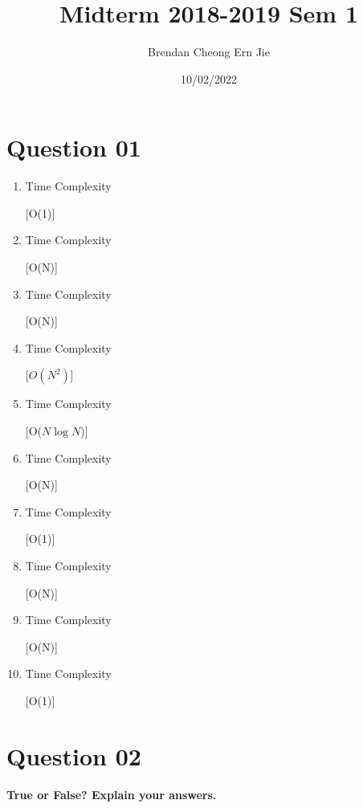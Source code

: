 \documentclass{article}
\title{Midterm 2018-2019 Sem 1}
\author{Brendan Cheong Ern Jie}
\date {10/02/2022}
\begin{document}
\maketitle

\section{Question 01}

\begin{enumerate}[label=(\arabic*)]

\item Time Complexity

[O(1)]

\item Time Complexity

[O(N)]

\item Time Complexity

[O(N)]

\item Time Complexity

[$O(N^2)$]

\item Time Complexity

[O($N\log N$)]

\item Time Complexity

[O(N)]

\item Time Complexity

[O(1)]

\item Time Complexity

[O(N)]

\item Time Complexity

[O(N)]

\item Time Complexity

[O(1)]

\end{enumerate}

\section{Question 02}
\textbf{True or False? Explain your answers.}
\\
\end{document}
